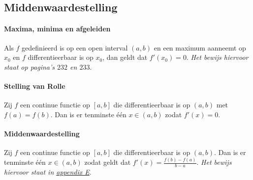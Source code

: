 \subsection{Middenwaardestelling}

\paragraph{Maxima, minima en afgeleiden} Als $f$ gedefinieerd is op een open interval $(a,b)$ en een maximum aanneemt op $x_{0}$ en $f$ differentieerbaar is op $x_{0}$, dan geldt dat $f'(x_{0})=0$. \textit{Het bewijs hiervoor staat op pagina's $232$ en $233$}.

\paragraph{Stelling van Rolle} Zij $f$ een continue functie op $[a,b]$ die differentieerbaar is op $(a,b)$ met $f(a)=f(b)$. Dan is er tenminste één $x\in(a,b)$ zodat $f'(x)=0$.

\paragraph{Middenwaardestelling} Zij $f$ een continue functie op $[a,b]$ die differentieerbaar is op $(a,b)$. Dan is er tenminste één $x\in(a,b)$ zodat geldt dat $f'(x)=\frac{f(b)-f(a)}{b-a}$. \textit{Het bewijs hiervoor staat in \hyperref[sec:AE]{appendix E}}.
